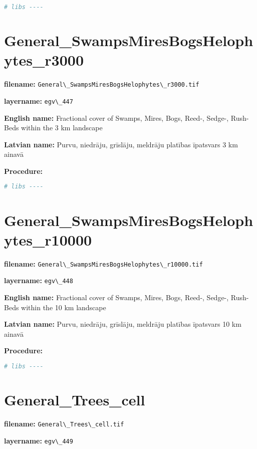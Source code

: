 \documentclass[
]{book}
\newcommand{\passthrough}[1]{#1}
\begin{document}
\begin{lstlisting}[language=R]
# libs ----
\end{lstlisting}

\section{General\_SwampsMiresBogsHelophytes\_r3000}\label{ch06.447}

\textbf{filename:} \passthrough{\lstinline!General\_SwampsMiresBogsHelophytes\_r3000.tif!}

\textbf{layername:} \passthrough{\lstinline!egv\_447!}

\textbf{English name:} Fractional cover of Swamps, Mires, Bogs, Reed-, Sedge-, Rush- Beds within the 3 km landscape

\textbf{Latvian name:} Purvu, niedrāju, grīslāju, meldrāju platības īpatsvars 3 km ainavā

\textbf{Procedure:}

\begin{lstlisting}[language=R]
# libs ----
\end{lstlisting}

\section{General\_SwampsMiresBogsHelophytes\_r10000}\label{ch06.448}

\textbf{filename:} \passthrough{\lstinline!General\_SwampsMiresBogsHelophytes\_r10000.tif!}

\textbf{layername:} \passthrough{\lstinline!egv\_448!}

\textbf{English name:} Fractional cover of Swamps, Mires, Bogs, Reed-, Sedge-, Rush- Beds within the 10 km landscape

\textbf{Latvian name:} Purvu, niedrāju, grīslāju, meldrāju platības īpatsvars 10 km ainavā

\textbf{Procedure:}

\begin{lstlisting}[language=R]
# libs ----
\end{lstlisting}

\section{General\_Trees\_cell}\label{ch06.449}

\textbf{filename:} \passthrough{\lstinline!General\_Trees\_cell.tif!}

\textbf{layername:} \passthrough{\lstinline!egv\_449!}
\end{document}
